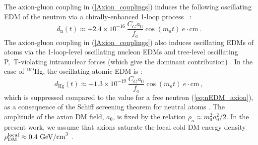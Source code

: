 The axion-gluon coupling in (\ref{Axion_couplings}) induces the following oscillating EDM of the neutron via a chirally-enhanced 1-loop process~%
\cite{tuningfootnote,Witten1979,*Witten1979B,Pospelov1999}:
\begin{equation}
\label{eq:nEDM_axion}
d_\mathrm{n}(t) \approx +2.4 \times 10^{-16} ~ \frac{C_G a_0}{f_a} \cos(m_a t) ~ e \cdot \textrm{cm} \, .
\end{equation}
The axion-gluon coupling in (\ref{Axion_couplings}) also induces oscillating EDMs of atoms via the 1-loop-level oscillating nucleon EDMs and tree-level oscillating P,~T-violating intranuclear forces (which give the dominant contribution) \cite{Stadnik2014A,Flambaum1984EDM,*Flambaum1984EDMB}.
In the case of $^{199}$Hg, the oscillating atomic EDM is \cite{Stadnik2014A,StadnikThesis,Flambaum1985EDM,Flambaum1985EDMB,Flambaum2002EDM,Dmitriev2003A,Dmitriev2003B,Dmitriev2005,Engel2005,Engel2010}:
\begin{equation}
\label{199Hg-EDM_axion}
d_{\textrm{Hg}}(t) \approx +1.3 \times 10^{-19} ~ \frac{C_G a_0}{f_a} \cos(m_a t) ~ e \cdot \textrm{cm} \, ,
\end{equation}
which is suppressed compared to the value for a free neutron (\ref{eq:nEDM_axion}), as a consequence of the Schiff screening theorem for neutral atoms \cite{Schiff1963}.
The amplitude of the axion DM field, $a_0$, is fixed by the relation $\rho_a \approx m_a^2 a_0^2 /2$.
In the present work, we assume that axions saturate the local cold DM energy density $\rho_{\rm DM}^{\rm local} \approx 0.4~\textrm{GeV/cm}^3$ \cite{Catena2010}.






